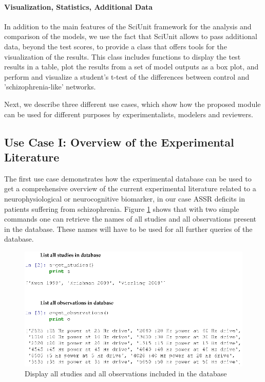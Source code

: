 \documentclass[CompPsych]{stjour}
\begin{document}
\paragraph{Visualization, Statistics, Additional Data}

In addition to the main features of the SciUnit framework for the analysis and comparison of the models, we use the fact that SciUnit allows to pass additional data, beyond the test scores, to provide
a class that offers tools for the visualization of the results. This class includes functions to display the test results in a table, plot the results from a set of model outputs as 
a box plot, and perform and visualize a student's t-test of the differences between control and 'schizophrenia-like' networks.

Next, we describe three different use cases, which show how the proposed module can be used for different purposes by experimentalists, modelers and reviewers. 


\subsection{Use Case I: Overview of the Experimental Literature}
The first use case demonstrates how the experimental database can be used to get a comprehensive overview of the current experimental literature related to a neurophysiological or neurocognitive biomarker, in our case
ASSR deficits in patients suffering from schizophrenia. Figure \ref{Fig:ListStudies} shows that with two
simple commands one can retrieve the names of all studies and all observations present in the database. These names will have to be used for all further queries of the database.

\begin{figure}
\includegraphics[width=\textwidth]{Figures/list_studies_observations}
\caption{Display all studies  and all observations included in the database}
\label{Fig:ListStudies}
\end{figure}
\end{document}
